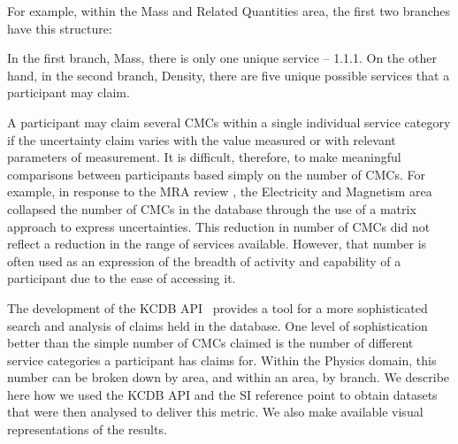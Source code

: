 \documentclass[
	a4paper, %
	10pt, %
	unnumberedsections, %
	twoside, %
]{LTJournalArticle}
\begin{document}
For example, within the Mass and Related Quantities area, the first two branches have this structure:

\vspace{5pt}













\vspace{5pt}

In the first branch, Mass, there is only one unique service -- 1.1.1. On the other hand, in the second branch, Density, there are five unique possible services that a participant may claim.

A participant may claim several CMCs within a single individual service category if the uncertainty claim varies with the value measured or with relevant parameters of measurement. It is difficult, therefore, to make meaningful comparisons between participants based simply on the number of CMCs. For example, in response to the MRA review \cite{MRAReview}, the Electricity and Magnetism area collapsed the number of CMCs in the database through the use of a matrix approach to express uncertainties. This reduction in number of CMCs did not reflect a reduction in the range of services available. However, that number is often used as an expression of the breadth of activity and capability of a participant due to the ease of accessing it.

The development of the KCDB API~\cite{KCDBapi} provides a tool for a more sophisticated search and analysis of claims held in the database. One level of sophistication better than the simple number of CMCs claimed is the number of different service categories a participant has claims for. Within the Physics domain, this number can be broken down by area, and within an area, by branch. We describe here how we used the KCDB API and the SI reference point to obtain datasets that were then analysed to deliver this metric. We also make available visual representations of the results.
\end{document}
